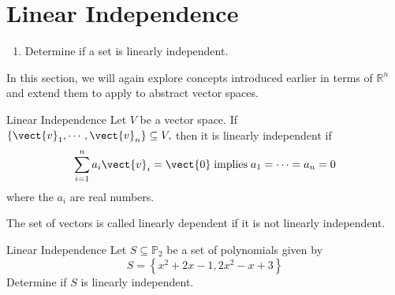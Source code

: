 \section{Linear Independence}

\begin{outcome}
\begin{enumerate}
\item[A.] Determine if a set is linearly independent.
\end{enumerate}
\end{outcome}

In this section, we will again explore concepts introduced earlier in terms of $\mathbb{R}^n$ and extend them to apply to abstract vector spaces. 

\begin{definition}{Linear Independence}\label{def:linearindependencevectorspace}
Let $V$ be a vector space. If $\{\vect{v}_{1},\cdots ,\vect{v}_{n}\} \subseteq V,$ then it is linearly independent
 if
\begin{equation*}
\sum_{i=1}^{n}a_{i}\vect{v}_{i}=\vect{0} \;\mbox{implies}\;
a_{1}=\cdots =a_{n}=0
\end{equation*}
where the $a_i$ are real numbers. 
\end{definition}

The
set of vectors is called linearly dependent if it is not linearly independent.

\begin{example}{Linear Independence}\label{exa:linearindependencepoly}
Let $S \subseteq \mathbb{P}_2$ be a set of polynomials given by
\[
S = \left\{ x^2 + 2x - 1, 2x^2 - x + 3 \right\}
\]
Determine if $S$ is linearly independent. 
\end{example}

